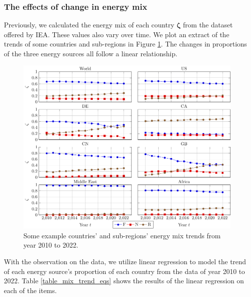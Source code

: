\documentclass[12pt]{article}
\begin{document}
\subsubsection{The effects of change in energy mix}

Previously, we calculated the energy mix of each country $\boldsymbol{\zeta}$ from the dataset offered by IEA. These values also vary over time. We plot an extract of the trends of some countries and sub-regions in Figure \ref{fig_mix_data}. The changes in proportions of the three energy sources all follow a linear relationship.

\begin{figure}[!t]
	\centering
	\includegraphics{figures/mix/mix.pdf}
	\caption{Some example countries' and sub-regions' energy mix trends from year 2010 to 2022.}
	\label{fig_mix_data}
\end{figure}

With the observation on the data, we utilize linear regression to model the trend of each energy source's proportion of each country from the data of year 2010 to 2022. Table \ref{table_mix_trend_eqs} shows the results of the linear regression on each of the items.
\end{document}
